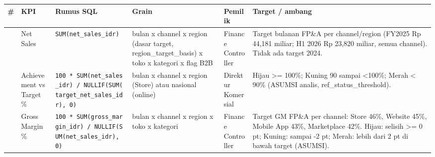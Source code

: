 \documentclass[10pt,a4paper]{article}
\begin{document}
{\def\LTcaptype{none} %
\begin{longtable}[]{@{}
  >{\raggedleft\arraybackslash}p{}
  >{\raggedright\arraybackslash}p{}
  >{\raggedright\arraybackslash}p{}
  >{\raggedright\arraybackslash}p{}
  >{\raggedright\arraybackslash}p{}
  >{\raggedright\arraybackslash}p{}@{}}
\toprule\noalign{}
\begin{minipage}[b]{\linewidth}\raggedleft
\#
\end{minipage} & \begin{minipage}[b]{\linewidth}\raggedright
KPI
\end{minipage} & \begin{minipage}[b]{\linewidth}\raggedright
Rumus SQL
\end{minipage} & \begin{minipage}[b]{\linewidth}\raggedright
Grain
\end{minipage} & \begin{minipage}[b]{\linewidth}\raggedright
Pemilik
\end{minipage} & \begin{minipage}[b]{\linewidth}\raggedright
Target / ambang
\end{minipage} \\
\midrule\noalign{}
\endhead
\bottomrule\noalign{}
\endlastfoot
1 & Net Sales & \texttt{SUM(net\_\allowbreak{}sales\_\allowbreak{}idr)} & bulan x channel x region (dasar target, region\_\allowbreak{}target\_\allowbreak{}basis) x toko x kategori x flag B2B & Finance Controller & Target bulanan FP\&A per channel/region (FY2025 Rp 44,181 miliar; H1 2026 Rp 23,820 miliar, semua channel). Tidak ada target 2024. \\
2 & Achievement vs Target \% & \texttt{100\ *\ SUM(net\_\allowbreak{}sales\_\allowbreak{}idr)\ /\ NULLIF(SUM(target\_\allowbreak{}net\_\allowbreak{}sales\_\allowbreak{}idr),\ 0)} & bulan x channel x region (Store) atau nasional (online) & Direktur Komersial & Hijau \textgreater= 100\%; Kuning 90 sampai \textless100\%; Merah \textless{} 90\% (ASUMSI analis, ref\_\allowbreak{}status\_\allowbreak{}threshold). \\
3 & Gross Margin \% & \texttt{100\ *\ SUM(gross\_\allowbreak{}margin\_\allowbreak{}idr)\ /\ NULLIF(SUM(net\_\allowbreak{}sales\_\allowbreak{}idr),\ 0)} & bulan x channel x region x toko x kategori & Finance Controller & Target GM FP\&A per channel: Store 46\%, Website 45\%, Mobile App 43\%, Marketplace 42\%. Hijau: selisih \textgreater= 0 pt; Kuning: sampai -2 pt; Merah: lebih dari 2 pt di bawah target (ASUMSI). \\

\end{longtable}}
\end{document}
